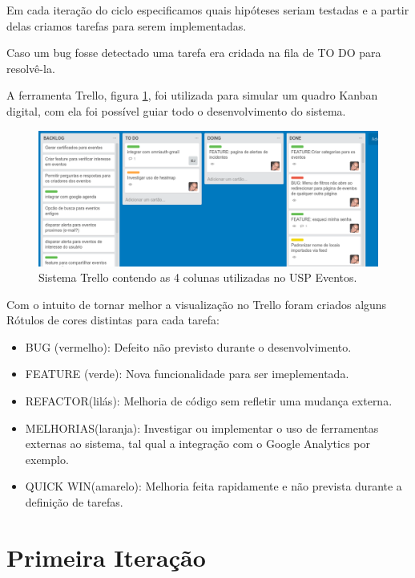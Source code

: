 \par Em cada iteração do ciclo especificamos quais hipóteses seriam testadas e a partir delas criamos tarefas para serem implementadas.
\par Caso um bug fosse detectado uma tarefa era cridada na fila de TO DO para resolvê-la.
\par A ferramenta Trello, figura \ref{fig:kanban}, foi utilizada para  simular um quadro Kanban digital, com ela foi possível guiar todo o desenvolvimento do sistema.
\begin{figure}[htb]
\includegraphics[width=15cm]{figuras/kanban}
\caption{\label{fig:kanban} Sistema Trello contendo as 4 colunas utilizadas no USP Eventos.}
\end{figure}
        Com o intuito de tornar melhor a visualização no Trello foram criados alguns Rótulos de cores distintas para cada tarefa:
        \begin{itemize}
        \item BUG (vermelho): Defeito não previsto durante o desenvolvimento.
        \item FEATURE (verde): Nova funcionalidade para ser imeplementada.
        \item REFACTOR(lilás):  Melhoria de código sem refletir uma mudança externa.
        \item MELHORIAS(laranja): Investigar ou implementar o uso de ferramentas externas ao sistema, tal qual a integração com o Google Analytics por exemplo.
        \item QUICK WIN(amarelo): Melhoria feita rapidamente e não prevista durante a definição de tarefas.
        \end{itemize}   
\section{Primeira Iteração}
